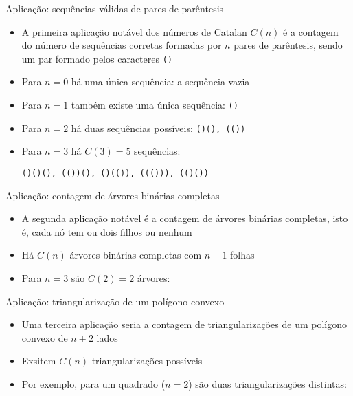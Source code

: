 \begin{frame}[fragile]{Aplicação: sequências válidas de pares de parêntesis}

    \begin{itemize}
        \item A primeira aplicação notável dos números de Catalan $C(n)$ é a contagem do número de
            sequências corretas formadas por $n$ pares de parêntesis, sendo um par formado pelos
            caracteres \texttt{()}

        \item Para $n = 0$ há uma única sequência: a sequência vazia

        \item Para $n = 1$ também existe uma única sequência: \texttt{()}

        \item Para $n = 2$ há duas sequências possíveis: \texttt{()(), (())}

        \item Para $n = 3$ há $C(3) = 5$ sequências:

\begin{center}
\texttt{()()(), (())(), ()(()), ((())), (()())}
\end{center}
    \end{itemize}

\end{frame}

\begin{frame}[fragile]{Aplicação: contagem de árvores binárias completas}

    \begin{itemize}
        \item A segunda aplicação notável é a contagem de árvores binárias completas, isto é, cada
            nó tem ou dois filhos ou nenhum

        \item Há $C(n)$ árvores binárias completas com $n + 1$ folhas

        \item Para $n = 3$ são $C(2) = 2$ árvores:

        

    \end{itemize}

\end{frame}

\begin{frame}[fragile]{Aplicação: triangularização de um polígono convexo}

    \begin{itemize}
        \item Uma terceira aplicação seria a contagem de triangularizações de um polígono convexo
            de $n+2$ lados

        \item Exsitem $C(n)$ triangularizações possíveis

        \item Por exemplo, para um quadrado ($n = 2$) são duas triangularizações distintas:

        
    \end{itemize}

\end{frame}
